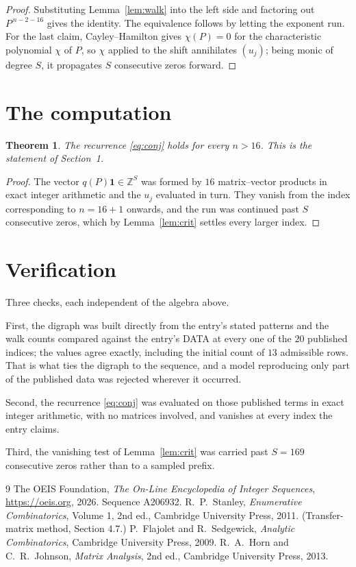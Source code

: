 \documentclass[11pt,a4paper]{article}
\theoremstyle{plain}
\newtheorem{theorem}{Theorem}
\theoremstyle{definition}
\begin{document}
\begin{proof}
Substituting Lemma~\ref{lem:walk} into the left side and factoring out
$P^{\,n-2-16}$ gives the identity. The equivalence follows by letting the exponent
run. For the last claim, Cayley--Hamilton gives $\chi(P)=0$ for the characteristic
polynomial $\chi$ of $P$, so $\chi$ applied to the shift annihilates $(u_j)$; being monic of
degree $S$, it propagates $S$ consecutive zeros forward.
\end{proof}

\section{The computation}

\begin{theorem}
The recurrence \eqref{eq:conj} holds for every $n>16$. This is the statement of
Section~1.
\end{theorem}

\begin{proof}
The vector $q(P)\mathbf{1}\in\mathbb{Z}^{S}$ was formed by $16$ matrix--vector
products in exact integer arithmetic and the $u_j$ evaluated in turn. They vanish from the
index corresponding to $n=16+1$ onwards, and the run was continued past $S$ consecutive
zeros, which by Lemma~\ref{lem:crit} settles every larger index.
\end{proof}

\section{Verification}

Three checks, each independent of the algebra above.

First, the digraph was built directly from the entry's stated patterns and the walk counts
compared against the entry's DATA at every one of the $20$ published indices; the
values agree exactly, including the initial count of $13$ admissible rows. That is
what ties the digraph to the sequence, and a model reproducing only part of the published
data was rejected wherever it occurred.

Second, the recurrence \eqref{eq:conj} was evaluated on those published terms in exact
integer arithmetic, with no matrices involved, and vanishes at every index the entry claims.

Third, the vanishing test of Lemma~\ref{lem:crit} was carried past $S=169$ consecutive
zeros rather than to a sampled prefix.

\begin{thebibliography}{9}
 The OEIS Foundation, \emph{The On-Line Encyclopedia of Integer
Sequences}, \url{https://oeis.org}, 2026. Sequence A206932.
 R.~P.~Stanley, \emph{Enumerative Combinatorics}, Volume 1, 2nd ed.,
Cambridge University Press, 2011. (Transfer-matrix method, Section 4.7.)
 P.~Flajolet and R.~Sedgewick, \emph{Analytic Combinatorics}, Cambridge
University Press, 2009.
 R.~A.~Horn and C.~R.~Johnson, \emph{Matrix Analysis}, 2nd ed., Cambridge
University Press, 2013.
\end{thebibliography}
\end{document}

